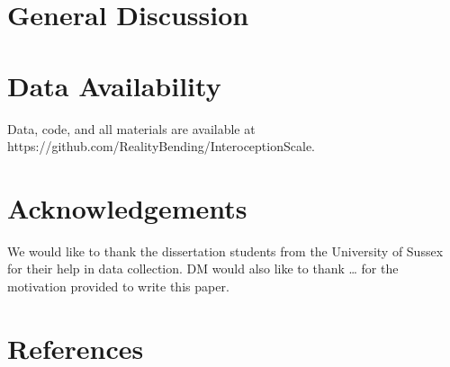 \documentclass[
  jou,
  floatsintext,
  longtable,
  nolmodern,
  notxfonts,
  notimes,
  colorlinks=true,linkcolor=blue,citecolor=blue,urlcolor=blue]{apa7}
\begin{document}
\section{General Discussion}\label{general-discussion}

\section{Data Availability}\label{data-availability}

Data, code, and all materials are available at
https://github.com/RealityBending/InteroceptionScale.

\section{Acknowledgements}\label{acknowledgements}

We would like to thank the dissertation students from the University of
Sussex for their help in data collection. DM would also like to thank
\ldots{} for the motivation provided to write this paper.

\section{References}\label{references}
\end{document}
